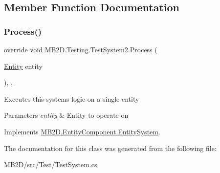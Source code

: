 \subsection{Member Function Documentation}
\hypertarget{class_m_b2_d_1_1_testing_1_1_test_system2_a0fbdd06fd0de796cfec32b7e025f73fe}{}\label{class_m_b2_d_1_1_testing_1_1_test_system2_a0fbdd06fd0de796cfec32b7e025f73fe} 
\subsubsection{\texorpdfstring{Process()}{Process()}}
{\footnotesize\ttfamily override void M\+B2\+D.\+Testing.\+Test\+System2.\+Process (\begin{DoxyParamCaption}\item[{\hyperlink{class_m_b2_d_1_1_entity_component_1_1_entity}{Entity}}]{entity }\end{DoxyParamCaption})\hspace{0.3cm}{\ttfamily [inline]}, {\ttfamily [protected]}, {\ttfamily [virtual]}}



Executes this systems logic on a single entity 


\begin{DoxyParams}{Parameters}
{\em entity} & Entity to operate on\\
\hline
\end{DoxyParams}


Implements \hyperlink{class_m_b2_d_1_1_entity_component_1_1_entity_system_abbf83b87cb5d12754fb058cef50451fa}{M\+B2\+D.\+Entity\+Component.\+Entity\+System}.



The documentation for this class was generated from the following file\+:\begin{DoxyCompactItemize}
\item 
M\+B2\+D/src/\+Test/Test\+System.\+cs\end{DoxyCompactItemize}
